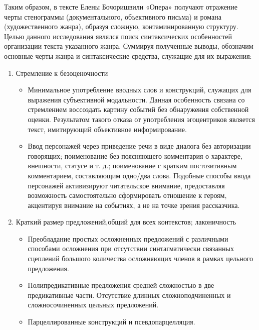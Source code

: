 \documentclass{kursa4}
\begin{document}
  Таким образом, в тексте Елены Бочоришвили «Опера» получают отражение черты стенограммы (документального, объективного письма) и романа (художественного жанра), образуя сложную, контаминированную структуру. Целью данного исследования являлся поиск синтаксических особенностей организации текста указанного жанра. Суммируя полученные выводы, обозначим основные черты жанра и синтаксические средства, служащие для их выражения:  

  \begin{enumerate}
    \item{Стремление к безоценочности}
    \begin{itemize}
      \item{Минимальное употребление вводных слов и конструкций, служащих для выражения субъективной модальности. Данная особенность связана со стремлением воссоздать картину событий без обнаружения собственной оценки. Результатом такого отказа от употребления эгоцентриков является текст, имитирующий объективное информирование.} 
      \item{Ввод персонажей через приведение речи в виде диалога без авторизации говорящих; поименование без поясняющего комментария о характере, внешности, статусе и т. д.; поименование с кратким постозитивным комментарием, составляющим одно/два слова. Подобные способы ввода персонажей активизируют читательское внимание, предоставляя возможность самостоятельно сформировать отношение к героям, акцентируя внимание на событиях, а не на точке зрения рассказчика.}
    \end{itemize}

    \item{Краткий размер предложений,общий для всех контекстов; лаконичность}
    \begin{itemize}
      \item{Преобладание простых осложненных предложений с различными способами осложнения при отсутствии синтагматически связанных сцеплений большого количества осложняющих членов в рамках цельного предложения.}
      \item{Полипредикативные предложения средней сложностью в две предикативные части. Отсутствие длинных сложноподчиненных и сложносочиненных цельных предложений.}
      \item{Парцеллированные конструкций и псевдопарцелляция. }
    \end{itemize}


\end{enumerate}
\end{document}
